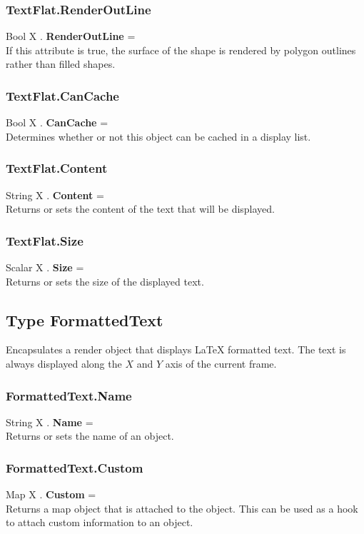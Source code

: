 \documentclass[10pt]{book}
\begin{document}
\subsubsection{TextFlat.RenderOutLine \label{F:TextFlat:RenderOutLine}}
Bool X . \textbf{RenderOutLine} = \\
If this attribute is true, the surface of the shape is rendered by polygon outlines rather than filled shapes.

\subsubsection{TextFlat.CanCache \label{F:TextFlat:CanCache}}
Bool X . \textbf{CanCache} = \\
Determines whether or not this object can be cached in a display list.

\subsubsection{TextFlat.Content \label{F:TextFlat:Content}}
String X . \textbf{Content} = \\
Returns or sets the content of the text that will be displayed.

\subsubsection{TextFlat.Size \label{F:TextFlat:Size}}
Scalar X . \textbf{Size} = \\
Returns or sets the size of the displayed text.

\subsection{Type FormattedText \label{T:FormattedText}}
Encapsulates a render object that displays LaTeX formatted text. The text is always displayed along the $X$ and $Y$ axis of the current frame.

\subsubsection{FormattedText.Name \label{F:FormattedText:Name}}
String X . \textbf{Name} = \\
Returns or sets the name of an object.

\subsubsection{FormattedText.Custom \label{F:FormattedText:Custom}}
Map X . \textbf{Custom} = \\
Returns a map object that is attached to the object. This can be used as a hook to attach custom information to an object.
\end{document}
